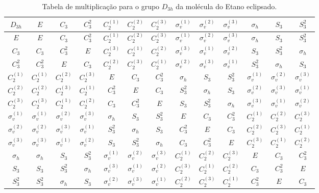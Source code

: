 \documentclass[a4paper,10pt]{article}
\begin{document}
\begin{table}[ht]
\caption{Tabela de multiplicação para o grupo $D_{3h}$ da molécula do Etano eclipsado.}
\centering

\begin{tabular} { |c|c c c c c c c c c c c c | }
\hline
$D_{3h}$ & $E$ & $C_3$ & $C_3^2$ & $C_2^{(1)}$ & $C_2^{(2)}$ & $C_2^{(3)}$ & $\sigma_v^{(1)}$ & $\sigma_v^{(2)}$ & $\sigma_v^{(3)}$ & $\sigma_h$ & $S_3$ & $S_3^2$ \\
\hline
$E$ & $E$ & $C_3$ & $C_3^2$ & $C_2^{(1)}$ & $C_2^{(2)}$ & $C_2^{(3)}$ & $\sigma_v^{(1)}$ & $\sigma_v^{(2)}$ & $\sigma_v^{(3)}$ & $\sigma_h$ & $S_3$ & $S_3^2$ \\
$C_3$ & $C_3$ & $C_3^2$ & $E$ & $C_2^{(3)}$ & $C_2^{(1)}$ & $C_2^{(2)}$ & $\sigma_v^{(3)}$ & $\sigma_v^{(1)}$ & $\sigma_v^{(2)}$ & $S_3$ & $S_3^2$ & $\sigma_h$ \\
$C_3^2$ & $C_3^2$ & $E$ & $C_3$ & $C_2^{(2)}$ & $C_2^{(3)}$ & $C_2^{(1)}$ & $\sigma_v^{(2)}$ & $\sigma_v^{(3)}$ & $\sigma_v^{(1)}$ & $S_3^2$ & $\sigma_h$ & $S_3$ \\
$C_2^{(1)}$ & $C_2^{(1)}$ & $C_2^{(2)}$ & $C_2^{(3)}$ & $E$ & $C_3$ & $C_3^2$ & $\sigma_h$ & $S_3$ & $S_3^2$ & $\sigma_v^{(1)}$ & $\sigma_v^{(2)}$ & $\sigma_v^{(3)}$ \\
$C_2^{(2)}$ & $C_2^{(2)}$ & $C_2^{(3)}$ & $C_2^{(1)}$ & $C_3^2$ & $E$ & $C_3$ & $S_3^2$ & $\sigma_h$ & $S_3$ & $\sigma_v^{(2)}$ & $\sigma_v^{(3)}$ & $\sigma_v^{(1)}$ \\
$C_2^{(3)}$ & $C_2^{(3)}$ & $C_2^{(1)}$ & $C_2^{(2)}$ & $C_3$ & $C_3^2$ & $E$ & $S_3$ & $S_3^2$ & $\sigma_h$ & $\sigma_v^{(3)}$ & $\sigma_v^{(1)}$ & $\sigma_v^{(2)}$ \\
$\sigma_v^{(1)}$ & $\sigma_v^{(1)}$ & $\sigma_v^{(2)}$ & $\sigma_v^{(3)}$ & $\sigma_h$ & $S_3$ & $S_3^2$ & $E$ & $C_3$ & $C_3^2$ & $C_2^{(1)}$ & $C_2^{(2)}$ & $C_2^{(3)}$ \\
$\sigma_v^{(2)}$ & $\sigma_v^{(2)}$ & $\sigma_v^{(3)}$ & $\sigma_v^{(1)}$ & $S_3^2$ & $\sigma_h$ & $S_3$ & $C_3^2$ & $E$ & $C_3$ & $C_2^{(2)}$ & $C_2^{(3)}$ & $C_2^{(1)}$ \\
$\sigma_v^{(3)}$ & $\sigma_v^{(3)}$ & $\sigma_v^{(1)}$ & $\sigma_v^{(2)}$ & $S_3$ & $S_3^2$ & $\sigma_h$ & $C_3$ & $C_3^2$ & $E$ & $C_2^{(3)}$ & $C_2^{(1)}$ & $C_2^{(2)}$ \\
$\sigma_h$ & $\sigma_h$ & $S_3$ & $S_3^2$ & $\sigma_v^{(1)}$ & $\sigma_v^{(2)}$ & $\sigma_v^{(3)}$ & $C_2^{(1)}$ & $C_2^{(2)}$ & $C_2^{(3)}$ & $E$ & $C_3$ & $C_3^2$ \\
$S_3$ & $S_3$ & $S_3^2$ & $\sigma_h$ & $\sigma_v^{(3)}$ & $\sigma_v^{(1)}$ & $\sigma_v^{(2)}$ & $C_2^{(3)}$ & $C_2^{(1)}$ & $C_2^{(2)}$ & $C_3$ & $C_3^2$ & $E$ \\
$S_3^2$ & $S_3^2$ & $\sigma_h$ & $S_3$ & $\sigma_v^{(2)}$ & $\sigma_v^{(3)}$ & $\sigma_v^{(1)}$ & $C_2^{(2)}$ & $C_2^{(3)}$ & $C_2^{(1)}$ & $C_3^2$ & $E$ & $C_3$ \\
\hline
\end{tabular}

\label{tab:mult_D3h}
\end{table}
\end{document}
